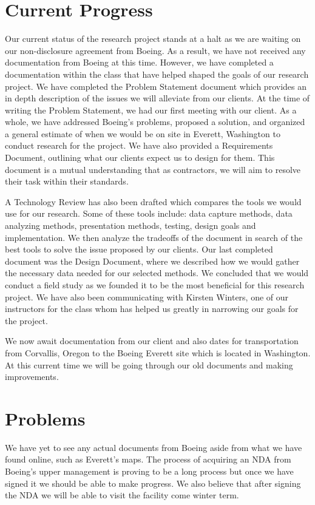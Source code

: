 \documentclass[onecolumn, draftclsnofoot,10pt, compsoc]{IEEEtran}
\begin{document}
\section{Current Progress}

Our current status of the research project stands at a halt as we are waiting on our non-disclosure agreement from Boeing. As a result, we have not received any documentation from Boeing at this time. However, we have completed a documentation within the class that have helped shaped the goals of our research project. We have completed the Problem Statement document which provides an in depth description of the issues we will alleviate from our clients. At the time of writing the Problem Statement, we had our first meeting with our client. As a whole, we have addressed Boeing’s problems, proposed a solution, and organized a general estimate of when we would be on site in Everett, Washington to conduct research for the project. We have also provided a Requirements Document, outlining what our clients expect us to design for them. This document is a mutual understanding that as contractors, we will aim to resolve their task within their standards. 


A Technology Review has also been drafted which compares the tools we would use for our research. Some of these tools include: data capture methods, data analyzing methods, presentation methods, testing, design goals and implementation. We then analyze the tradeoffs of the document in search of the best tools to solve the issue proposed by our clients. Our last completed document was the Design Document, where we described how we would gather the necessary data needed for our selected methods. We concluded that we would conduct a field study as we founded it to be the most beneficial for this research project. We have also been communicating with Kirsten Winters, one of our instructors for the class whom has helped us greatly in narrowing our goals for the project. 


We now await documentation from our client and also dates for transportation from Corvallis, Oregon to the Boeing Everett site which is located in Washington. At this current time we will be going through our old documents and making improvements. 

\section{Problems}
We have yet to see any actual documents from Boeing aside from what we have found online, such as Everett’s maps. The process of acquiring an NDA from Boeing’s upper management is proving to be a long process but once we have signed it we should be able to make progress. We also believe that after signing the NDA we will be able to visit the facility come winter term.
\end{document}

